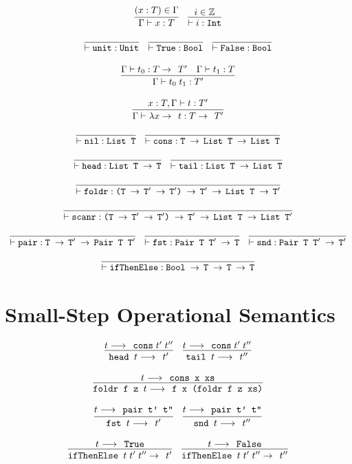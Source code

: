 \documentclass[10pt]{article}
\newcommand{\ttt}[1]{\texttt{#1}}
\newcommand{\ra}{\ensuremath{\rightarrow\;\,}}
\newcommand{\reduces}{\ensuremath{\longrightarrow\;\,}}
\begin{document}
\[
  \begin{array}{cc}
    \infer{\Gamma \vdash x : T}{(x : T) \in \Gamma}
    ~~~
    \infer{\vdash i : \ttt{Int}}{i \in \mathbb{Z}}
    \\\\
    \infer{\vdash \ttt{unit} : \ttt{Unit}}{}
    ~~~
    \infer{\vdash \ttt{True} : \ttt{Bool}}{}
    ~~~
    \infer{\vdash \ttt{False} : \ttt{Bool}}{}
    \\\\
    \infer{\Gamma \vdash t_0\; t_1 : T'}{\Gamma \vdash t_0 : T \ra T' & \Gamma \vdash t_1 : T}
    \\\\
    \infer{\Gamma \vdash \lambda x \ra t : T \ra T'}{x : T, \Gamma \vdash t : T'}
    \\\\
    \infer{\vdash \ttt{nil} : \ttt{List T}}{}
    ~~~
    \infer{\vdash \ttt{cons} : \ttt{T \ra List T \ra List T}}{}
    \\\\
    \infer{\vdash \ttt{head} : \ttt{List T \ra T}}{}
    ~~~
    \infer{\vdash \ttt{tail} : \ttt{List T \ra List T}}{}
    \\\\
    \infer{\vdash \ttt{foldr} : \ttt{(T \ra T$'$ \ra T$'$) \ra T$'$ \ra List T \ra T$'$}}{}
    \\\\
    \infer{\vdash \ttt{scanr} : \ttt{(T \ra T$'$ \ra T$'$) \ra T$'$ \ra List T \ra List T$'$}}{}
    \\\\
    \infer{\vdash \ttt{pair} : \ttt{T \ra T$'$ \ra Pair T T$'$}}{}
    ~~~
    \infer{\vdash \ttt{fst} : \ttt{Pair T T$'$ \ra T}}{}
    ~~~
    \infer{\vdash \ttt{snd} : \ttt{Pair T T$'$ \ra T$'$}}{}
    \\\\
    \infer{\vdash \ttt{ifThenElse} : \ttt{Bool \ra T \ra T \ra T}}{}
  \end{array}
\]

\section{Small-Step Operational Semantics}

\[
  \begin{array}{cc}
    \infer{\ttt{head } t \reduces t'}{t \reduces \ttt{cons}\; t'\; t''}
    ~~~
    \infer{\ttt{tail } t \reduces t''}{t \reduces \ttt{cons}\; t'\; t''}
    \\\\
    \infer{\ttt{foldr f z $t$} \reduces \ttt{f x (foldr f z xs)}}{t \reduces \ttt{cons x xs}}
    \\\\
    \infer{\ttt{fst } t \reduces t'}{t \reduces \ttt{pair t' t''}}
    ~~~
    \infer{\ttt{snd } t \reduces t''}{t \reduces \ttt{pair t' t''}}
    \\\\
    \infer{\ttt{ifThenElse } t\; t'\; t'' \ra t'}{t \reduces \ttt{True}}
    ~~~
    \infer{\ttt{ifThenElse } t\; t'\; t'' \ra t''}{t \reduces \ttt{False}}
    
  \end{array}
\]
\end{document}
